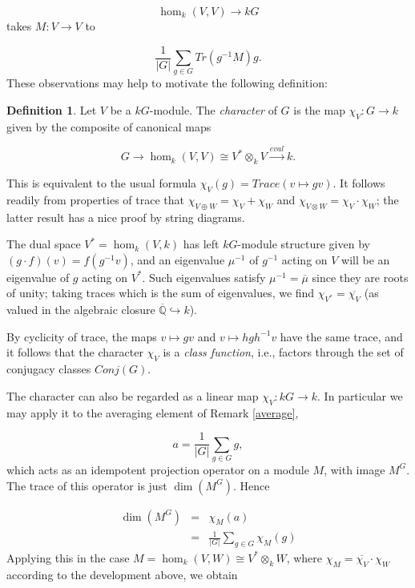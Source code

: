 \documentclass[12pt,titlepage]{article}
\newcommand{\itexarray}[1]{\begin{matrix}#1\end{matrix}}
\newcommand{\widebar}{\overline}
\theoremstyle{plain}
\theoremstyle{definition}
\newtheorem{defn}{Definition}
\theoremstyle{remark}
\begin{document}
\begin{displaymath}
\hom_k(V, V) \to k G
\end{displaymath}
takes $M: V \to V$ to

\begin{displaymath}
\frac1{{|G|}} \sum_{g \in G} Tr(g^{-1}M) g.
\end{displaymath}
These observations may help to motivate the following definition:

\begin{defn}
\label{}\hypertarget{}{}
Let $V$ be a $k G$-module. The \emph{character} of $G$ is the map $\chi_V: G \to k$ given by the composite of canonical maps

\begin{displaymath}
G \to \hom_k(V, V) \cong V^\ast \otimes_k V \stackrel{eval}{\to} k.
\end{displaymath}
\end{defn}
This is equivalent to the usual formula $\chi_V(g) = Trace(v \mapsto g v)$. It follows readily from properties of trace that $\chi_{V \oplus W} = \chi_V + \chi_W$ and $\chi_{V \otimes W} = \chi_V \cdot \chi_W$; the latter result has a nice proof by string diagrams.

The dual space $V^\ast = \hom_k(V, k)$ has left $k G$-module structure given by $(g \cdot f)(v) = f(g^{-1}v)$, and an eigenvalue $\mu^{-1}$ of $g^{-1}$ acting on $V$ will be an eigenvalue of $g$ acting on $V^\ast$. Such eigenvalues satisfy $\mu^{-1} = \widebar{\mu}$ since they are roots of unity; taking traces which is the sum of eigenvalues, we find $\chi_{V^\ast} = \widebar{\chi_V}$ (as valued in the algebraic closure $\widebar{\mathbb{Q}} \hookrightarrow k$).

By cyclicity of trace, the maps $v \mapsto g v$ and $v \mapsto h g h^{-1} v$ have the same trace, and it follows that the character $\chi_V$ is a \emph{class function}, i.e., factors through the set of conjugacy classes $Conj(G)$.

The character can also be regarded as a linear map $\chi_V: k G \to k$. In particular we may apply it to the averaging element of Remark \ref{average},

\begin{displaymath}
a = \frac1{{|G|}} \sum_{g \in G} g,
\end{displaymath}
which acts as an idempotent projection operator on a module $M$, with image $M^G$. The trace of this operator is just $\dim(M^G)$. Hence

\begin{displaymath}
\itexarray{
\dim(M^G) & = & \chi_M(a) \\ 
 & = & \frac1{{|G|}} \sum_{g \in G} \chi_M(g)
}
\end{displaymath}
Applying this in the case $M = \hom_k(V, W) \cong V^\ast \otimes_k W$, where $\chi_M = \widebar{\chi_V} \cdot \chi_W$ according to the development above, we obtain
\end{document}
